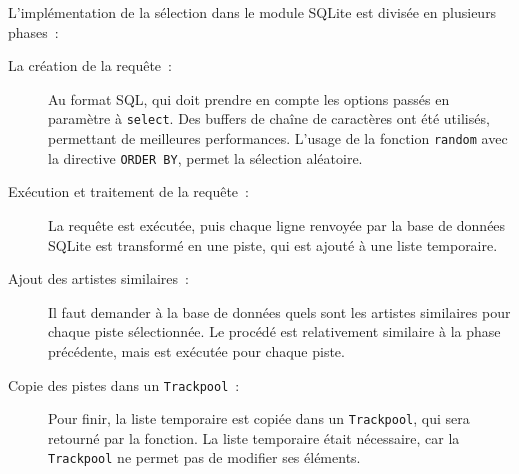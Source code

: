 L’implémentation de la sélection dans le module SQLite est divisée en plusieurs
phases~:
\begin{description}
  \item[La création de la requête~:] Au format SQL, qui doit prendre en compte
  les options passés en paramètre à \texttt{select}. Des buffers de chaîne de
  caractères ont été utilisés, permettant de meilleures performances. L'usage de
  la fonction \texttt{random} avec la directive \texttt{ORDER BY}, permet la
  sélection aléatoire.

  \item[Exécution et traitement de la requête~:] La requête est exécutée, puis
  chaque ligne renvoyée par la base de données SQLite est transformé en une
  piste, qui est ajouté à une liste temporaire.

  \item[Ajout des artistes similaires~:] Il faut demander à la base de données
  quels sont les artistes similaires pour chaque piste sélectionnée. Le procédé
  est relativement similaire à la phase précédente, mais est exécutée pour
  chaque piste.

  \item[Copie des pistes dans un \texttt{Trackpool}~:] Pour finir, la liste
  temporaire est copiée dans un \texttt{Trackpool}, qui sera retourné par la
  fonction. La liste temporaire était nécessaire, car la \texttt{Trackpool} ne
  permet pas de modifier ses éléments.
\end{description}